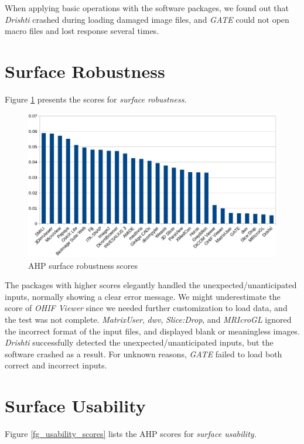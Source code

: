 When applying basic operations with the software packages, we found out that \textit{Drishti} crashed during loading damaged image files, and \textit{GATE} could not open macro files and lost response several times.

\section{Surface Robustness}
Figure \ref{fg_robustness_scores} presents the scores for \textit{surface robustness}.

\begin{figure}[H]
\includegraphics[scale=0.38]{figures/robustness_scores.png}
\caption{AHP surface robustness scores}
\label{fg_robustness_scores}
\end{figure}

The packages with higher scores elegantly handled the unexpected/unanticipated inputs, normally showing a clear error message. We might underestimate the score of \textit{OHIF Viewer} since we needed further customization to load data, and the test was not complete. \textit{MatrixUser}, \textit{dwv}, \textit{Slice:Drop}, and \textit{MRIcroGL} ignored the incorrect format of the input files, and displayed blank or meaningless images. \textit{Drishti} successfully detected the unexpected/unanticipated inputs, but the software crashed as a result. For unknown reasons, \textit{GATE} failed to load both correct and incorrect inputs.

\section{Surface Usability}
Figure \ref{fg_usability_scores} lists the AHP scores for \textit{surface usability}.

